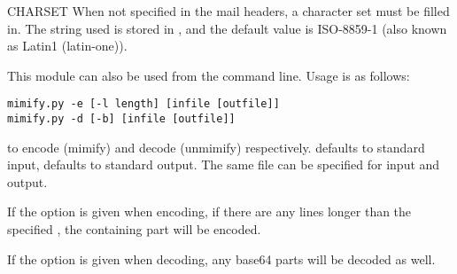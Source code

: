\begin{datadesc}{CHARSET}
When not specified in the mail headers, a character set must be filled
in.  The string used is stored in , and the default
value is ISO-8859-1 (also known as Latin1 (latin-one)).
\end{datadesc}

This module can also be used from the command line.  Usage is as
follows:
\begin{verbatim}
mimify.py -e [-l length] [infile [outfile]]
mimify.py -d [-b] [infile [outfile]]
\end{verbatim}
to encode (mimify) and decode (unmimify) respectively.  
defaults to standard input,  defaults to standard output.
The same file can be specified for input and output.

If the  option is given when encoding, if there are any lines
longer than the specified , the containing part will be
encoded.

If the  option is given when decoding, any base64 parts will
be decoded as well.

